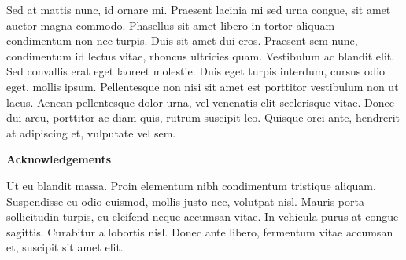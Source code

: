 Sed at mattis nunc, id ornare mi. Praesent lacinia mi sed urna congue,
sit amet auctor magna commodo. Phasellus sit amet libero in tortor
aliquam condimentum non nec turpis. Duis sit amet dui eros. Praesent
sem nunc, condimentum id lectus vitae, rhoncus ultricies
quam. Vestibulum ac blandit elit. Sed convallis erat eget laoreet
molestie. Duis eget turpis interdum, cursus odio eget, mollis
ipsum. Pellentesque non nisi sit amet est porttitor vestibulum non ut
lacus. Aenean pellentesque dolor urna, vel venenatis elit scelerisque
vitae. Donec dui arcu, porttitor ac diam quis, rutrum suscipit
leo. Quisque orci ante, hendrerit at adipiscing et, vulputate vel sem.

\begin{center}
    \large
    \vspace{0.9cm}
    \textbf{Acknowledgements}
\end{center}

Ut eu blandit massa. Proin elementum nibh condimentum tristique
aliquam. Suspendisse eu odio euismod, mollis justo nec, volutpat
nisl. Mauris porta sollicitudin turpis, eu eleifend neque accumsan
vitae. In vehicula purus at congue sagittis. Curabitur a lobortis
nisl. Donec ante libero, fermentum vitae accumsan et, suscipit sit
amet elit.

\newpage
